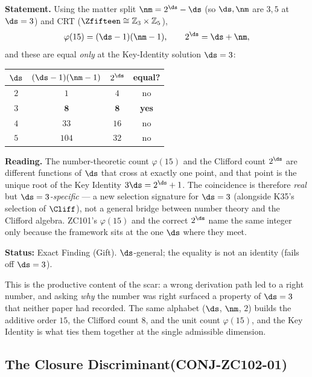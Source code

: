 \documentclass[12pt, a4paper]{article}
\begin{document}
\begin{giftbox}[title={FIND-ZC102-01: $\varphi(15)=2^{\ds}$ Is a $\ds=3$ Selection Signature (Gift)}]

\textbf{Statement.}
Using the matter split $\nm=2^{\ds}-\ds$ (so $\ds,\nm$ are $3,5$ at $\ds=3$) and
CRT ($\Zfifteen\cong\mathbb{Z}_3\times\mathbb{Z}_5$),
\[
  \varphi(15) = (\ds-1)(\nm-1), \qquad 2^{\ds} = \ds+\nm,
\]
and these are equal \emph{only} at the Key-Identity solution $\ds=3$:
\begin{center}
{\small\renewcommand{\arraystretch}{1.2}
\begin{tabular}{@{}cccc@{}}
\toprule
$\ds$ & $(\ds-1)(\nm-1)$ & $2^{\ds}$ & equal? \\
\midrule
$2$ & $1$   & $4$  & no \\
$3$ & $\mathbf{8}$ & $\mathbf{8}$ & \textbf{yes} \\
$4$ & $33$  & $16$ & no \\
$5$ & $104$ & $32$ & no \\
\bottomrule
\end{tabular}}
\end{center}

\textbf{Reading.} The number-theoretic count $\varphi(15)$ and the Clifford
count $2^{\ds}$ are different functions of $\ds$ that cross at exactly one point,
and that point is the unique root of the Key Identity $3\ds=2^{\ds}+1$. The
coincidence is therefore \emph{real} but \emph{$\ds=3$-specific} --- a new
selection signature for $\ds=3$ (alongside K35's selection of $\Cliff$), not a
general bridge between number theory and the Clifford algebra. ZC101's
$\varphi(15)$ and the correct $2^{\ds}$ name the same integer only because the
framework sits at the one $\ds$ where they meet.

\textbf{Status:} Exact Finding (Gift). $\ds$-general; the equality is not an
identity (fails off $\ds=3$).
\end{giftbox}

This is the productive content of the scar: a wrong derivation path led to a
right number, and asking \emph{why} the number was right surfaced a property of
$\ds=3$ that neither paper had recorded. The same alphabet ($\ds$, $\nm$, $2$)
builds the additive order $15$, the Clifford count $8$, and the unit count
$\varphi(15)$, and the Key Identity is what ties them together at the single
admissible dimension.

\subsection{The Closure Discriminant\quad(CONJ-ZC102-01)}
\label{sec:discriminant-zc102}
\end{document}
